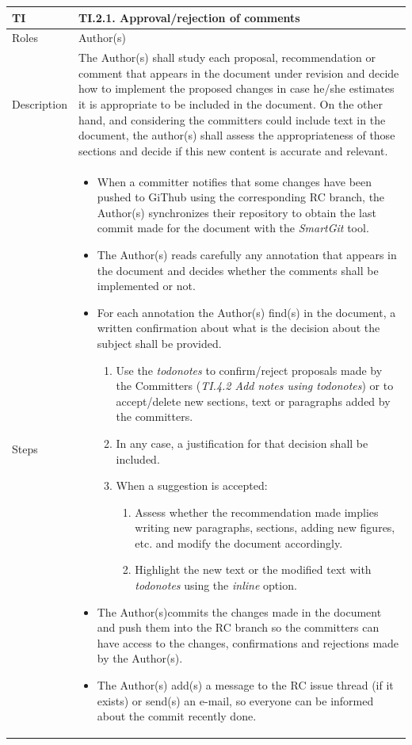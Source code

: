 \documentclass{template/openetcs_article}
\begin{document}
\begin{flushleft}
\tablefirsthead{}
\tablehead{}
\tabletail{}
\tablelasttail{}
\begin{supertabular}{|m{2cm}|m{13cm}|}
\hline
{}
TI & 
TI.2.1. Approval/rejection of comments
\\\hline
Roles &
Author(s)
\\\hline
Description &
The Author(s) shall study each proposal, recommendation or comment that appears in the document under revision and decide how to implement the proposed changes in case he/she estimates it is appropriate to be included in the document. On the other hand, and considering the committers could include text in the document, the author(s) shall assess the appropriateness of those sections and decide if this new content is accurate and relevant. 
\\\hline
Steps &
\begin{itemize}
\item When a committer notifies that some changes have been pushed to GiThub using the corresponding RC branch, the Author(s) synchronizes their repository to obtain the last commit made for the document with the {\it SmartGit} tool.
\item The Author(s) reads carefully any annotation that appears in the document and decides whether the comments shall be implemented or not.
\item For each annotation the Author(s) find(s) in the document, a written confirmation about what is the decision about the subject shall be provided. 
\begin{enumerate}
\item Use the {\it todonotes} to confirm/reject proposals made by the Committers ({\it TI.4.2 Add notes using todonotes}) or to accept/delete new sections, text or paragraphs added by the committers.
\item In any case, a justification for that decision shall be included.
\item When a suggestion is accepted:
\begin{enumerate}
\item Assess whether the recommendation made implies writing new paragraphs, sections, adding new figures, etc. and modify the document accordingly. 
\item Highlight the new text or the modified text with {\it todonotes} using the {\it inline} option.
\end{enumerate}
\end{enumerate}
\item The Author(s)commits the changes made in the document and push them into the RC branch so the committers can have access to the changes, confirmations and rejections made by the Author(s).
\item The Author(s) add(s) a message to the RC issue thread (if it exists) or send(s) an e-mail, so everyone can be informed about the commit recently done. 
\end{itemize}
\\\hline
\end{supertabular}
\end{flushleft}
\end{document}
